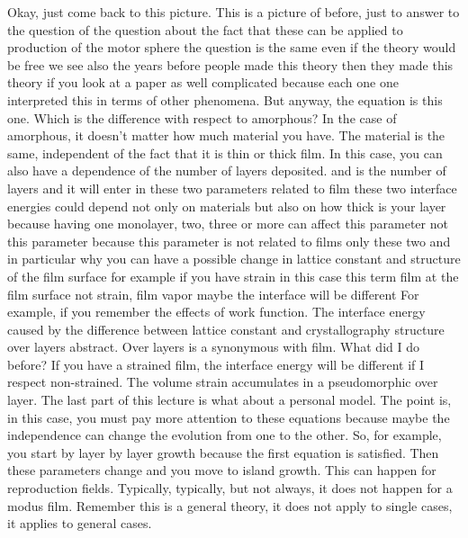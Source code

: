 Okay, just come back to this picture. This is a picture of before, just to answer to the question of the question about the fact that these can be applied to production of the motor sphere the question is the same even if the theory would be free we see also the years before people made this theory then they made this theory if you look at a paper as well complicated because each one one interpreted this in terms of other phenomena. But anyway, the equation is this one. Which is the difference with respect to amorphous? In the case of amorphous, it doesn't matter how much material you have. The material is the same, independent of the fact that it is thin or thick film. In this case, you can also have a dependence of the number of layers deposited. and is the number of layers and it will enter in these two parameters related to film these two interface energies could depend not only on materials but also on how thick is your layer because having one monolayer, two, three or more can affect this parameter not this parameter because this parameter is not related to films only these two and in particular why you can have a possible change in lattice constant and structure of the film surface for example if you have strain in this case this term film at the film surface not strain, film vapor maybe the interface will be different For example, if you remember the effects of work function. The interface energy caused by the difference between lattice constant and crystallography structure over layers abstract. Over layers is a synonymous with film. What did I do before? If you have a strained film, the interface energy will be different if I respect non-strained. The volume strain accumulates in a pseudomorphic over layer. The last part of this lecture is what about a personal model. The point is, in this case, you must pay more attention to these equations because maybe the independence can change the evolution from one to the other. So, for example, you start by layer by layer growth because the first equation is satisfied. Then these parameters change and you move to island growth. This can happen for reproduction fields. Typically, typically, but not always, it does not happen for a modus film. Remember this is a general theory, it does not apply to single cases, it applies to general cases.
